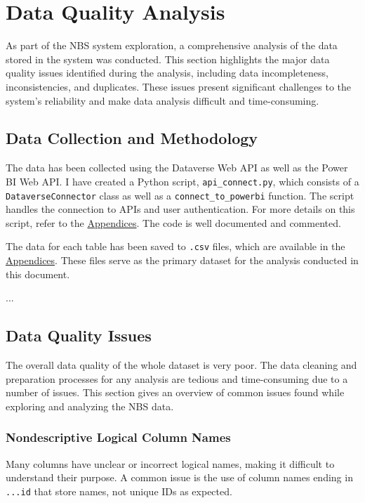 \section{Data Quality Analysis}

As part of the NBS system exploration, a comprehensive analysis of the data stored in the system was conducted. This section highlights the major data quality issues identified during the analysis, including data incompleteness, inconsistencies, and duplicates. These issues present significant challenges to the system’s reliability and make data analysis difficult and time-consuming.

\subsection{Data Collection and Methodology}

The data has been collected using the Dataverse Web API as well as the Power BI Web API. I have created a Python script, \texttt{api\_connect.py}, which consists of a \texttt{DataverseConnector} class as well as a \texttt{connect\_to\_powerbi} function. The script handles the connection to APIs and user authentication. For more details on this script, refer to the \hyperref[sec:Appendices]{Appendices}. The code is well documented and commented.

The data for each table has been saved to \texttt{.csv} files, which are available in the \hyperref[sec:Appendices]{Appendices}. These files serve as the primary dataset for the analysis conducted in this document.

...

\subsection{Data Quality Issues}

The overall data quality of the whole dataset is very poor. The data cleaning and preparation processes for any analysis are tedious and time-consuming due to a number of issues. This section gives an overview of common issues found while exploring and analyzing the NBS data.

\subsubsection{Nondescriptive Logical Column Names}
Many columns have unclear or incorrect logical names, making it difficult to understand their purpose. A common issue is the use of column names ending in \texttt{...id} that store names, not unique IDs as expected.

